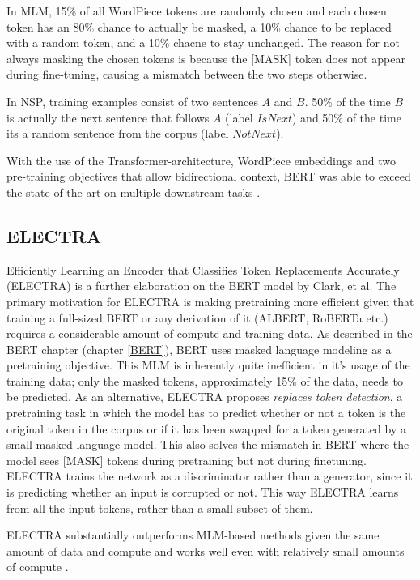 In MLM, 15\% of all WordPiece tokens are randomly chosen and each chosen token has an 80\% chance to actually be masked, a 10\% chance to be replaced with a random token, and a 10\% chacne to stay unchanged.
The reason for not always masking the chosen tokens is because the [MASK] token does not appear during fine-tuning, causing a mismatch between the two steps otherwise.

In NSP, training examples consist of two sentences $A$ and $B$.
50\% of the time $B$ is actually the next sentence that follows $A$ (label $IsNext$) and 50\% of the time its a random sentence from the corpus (label $NotNext$).

With the use of the Transformer-architecture, WordPiece embeddings and two pre-training objectives that allow bidirectional context, BERT was able to exceed the state-of-the-art on multiple downstream tasks \cite{devlin2019}.

\subsection{ELECTRA} \label{ELECTRA}
Efficiently Learning an Encoder that Classifies Token Replacements Accurately (ELECTRA) is a further elaboration on the BERT model by Clark, et al. \cite{clark2020}
The primary motivation for ELECTRA is making pretraining more efficient given that training a full-sized BERT or any derivation of it (ALBERT, RoBERTa etc.) requires a considerable amount of compute and training data.
As described in the BERT chapter (chapter \ref{BERT}), BERT uses masked language modeling as a pretraining objective.
This MLM is inherently quite inefficient in it's usage of the training data; only the masked tokens, approximately 15\% of the data, needs to be predicted.
As an alternative, ELECTRA proposes \textit{replaces token detection}, a pretraining task in which the model has to predict whether or not a token is the original token in the corpus or if it has been swapped for a token generated by a small masked language model.
This also solves the mismatch in BERT where the model sees [MASK] tokens during pretraining but not during finetuning.
ELECTRA trains the network as a discriminator rather than a generator, since it is predicting whether an input is corrupted or not.
This way ELECTRA learns from all the input tokens, rather than a small subset of them.

ELECTRA substantially outperforms MLM-based methods given the same amount of data and compute and works well even with relatively small amounts of compute \cite{clark2020}.
